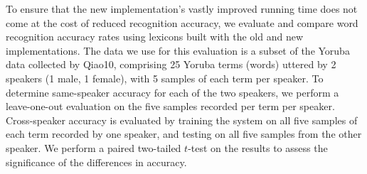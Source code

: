 \documentclass[11pt]{article}
\begin{document}
To ensure that the new implementation's vastly improved running time does not come at the cost of reduced recognition accuracy, we evaluate and compare word recognition accuracy rates using lexicons built with the old and new implementations. The data we use for this evaluation is a subset of the Yoruba data collected by 
\newcite
{Qiao10}, 
comprising 25 Yoruba terms (words) uttered by 2 speakers (1 male, 1 female), with 5 samples of each term per speaker. 
To determine same-speaker accuracy for each of the two speakers, we perform a leave-one-out evaluation on the five samples recorded per term per speaker. 
Cross-speaker accuracy is evaluated by training the system on all five samples of each term recorded by one speaker, and testing on all five samples from the other speaker.
We perform a paired two-tailed $t$-test on the results to assess the significance of the differences in accuracy.
\end{document}
